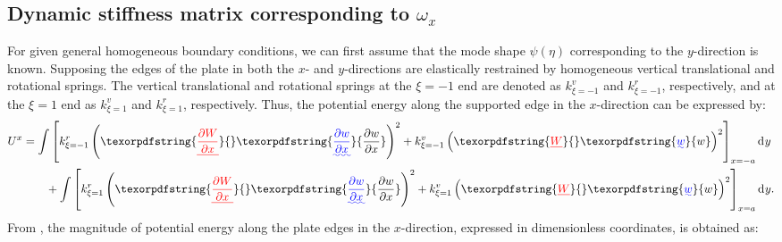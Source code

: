 \documentclass[preprint,12pt,number]{elsarticle}
\newcommand{\id}{\mathrm{d}\mkern1mu}
\providecommand{\DIFaddtex}[1]{{\protect\color{blue}\uwave{#1}}} %
\providecommand{\DIFdeltex}[1]{{\protect\color{red}\sout{#1}}}                      %
\providecommand{\DIFaddbegin}{} %
\providecommand{\DIFaddend}{} %
\providecommand{\DIFdelbegin}{} %
\providecommand{\DIFdelend}{} %
\providecommand{\DIFadd}[1]{\texorpdfstring{\DIFaddtex{#1}}{#1}} %
\providecommand{\DIFdel}[1]{\texorpdfstring{\DIFdeltex{#1}}{}} %
\newcommand{\DIFscaledelfig}{0.5}
\newlength{\DIFdelgraphicswidth} %
\newlength{\DIFdelgraphicsheight} %
\newcommand{\DIFaddincludegraphics}[2][]{{\color{blue}\fbox{\DIFOincludegraphics[#1]{#2}}}} %
\newcommand{\DIFdelincludegraphics}[2][]{%
\sbox{\DIFdelgraphicsbox}{\DIFOincludegraphics[#1]{#2}}%
\settoboxwidth{\DIFdelgraphicswidth}{\DIFdelgraphicsbox} %
\settoboxtotalheight{\DIFdelgraphicsheight}{\DIFdelgraphicsbox} %
\scalebox{\DIFscaledelfig}{%
\parbox[b]{\DIFdelgraphicswidth}{\usebox{\DIFdelgraphicsbox}\\[-\baselineskip] \rule{\DIFdelgraphicswidth}{0em}}\llap{\resizebox{\DIFdelgraphicswidth}{\DIFdelgraphicsheight}{%
\setlength{\unitlength}{\DIFdelgraphicswidth}%
\begin{picture}(1,1)%
\thicklines\linethickness{2pt} %
{\color[rgb]{1,0,0}\put(0,0){\framebox(1,1){}}}%
{\color[rgb]{1,0,0}\put(0,0){\line( 1,1){1}}}%
{\color[rgb]{1,0,0}\put(0,1){\line(1,-1){1}}}%
\end{picture}%
}\hspace*{3pt}}} %
} %
\DeclareRobustCommand{\DIFaddbegin}{\DIFOaddbegin \let\includegraphics\DIFaddincludegraphics} %
\DeclareRobustCommand{\DIFaddend}{\DIFOaddend \let\includegraphics\DIFOincludegraphics} %
\DeclareRobustCommand{\DIFdelbegin}{\DIFOdelbegin \let\includegraphics\DIFdelincludegraphics} %
\DeclareRobustCommand{\DIFdelend}{\DIFOaddend \let\includegraphics\DIFOincludegraphics} %
\begin{document}
\subsection{Dynamic stiffness matrix corresponding to $\omega_x$}\label{sec:DSMx}
For given general homogeneous boundary conditions, we can first assume that the mode shape $\psi(\eta)$ corresponding to the $y$-direction is known. 
Supposing the edges of the plate in both the $x$- and $y$-directions are elastically restrained by homogeneous vertical translational and rotational springs.
The vertical translational and rotational springs at the $\xi = -1$ end are denoted as $k^v_{\xi = -1}$ and $k^r_{\xi = -1}$, respectively, and at the $\xi = 1$ end as $k^v_{\xi = 1}$ and $k^r_{\xi = 1}$, respectively. 
Thus, the potential energy along the supported edge in the $x$-direction can be expressed by:
%
\begin{equation}\label{eq:poten_energy_edgex}
\begin{split}
	U^{x} &=  \int\left[k^r_{\xi=-1} \left( \DIFdelbegin \DIFdel{\frac{\partial W}{\partial x} }\DIFdelend \DIFaddbegin \DIFadd{\frac{\partial w}{\partial x} }\DIFaddend \right)^2 + k^v_{\xi=-1} \left( \DIFdelbegin \DIFdel{W }\DIFdelend \DIFaddbegin \DIFadd{w }\DIFaddend \right)^2\right]_{x=-a} \id y\\
	&\qquad +  \int\left[k^r_{\xi=1} \left( \DIFdelbegin \DIFdel{\frac{\partial W}{\partial x} }\DIFdelend \DIFaddbegin \DIFadd{\frac{\partial w}{\partial x} }\DIFaddend \right)^2 + k^v_{\xi=1} \left( \DIFdelbegin \DIFdel{W }\DIFdelend \DIFaddbegin \DIFadd{w }\DIFaddend \right)^2\right]_{x=a} \id y.
\end{split}
\end{equation}
%
From , the magnitude of potential energy along the plate edges in the $x$-direction, expressed in dimensionless coordinates, is obtained as:
\end{document}

